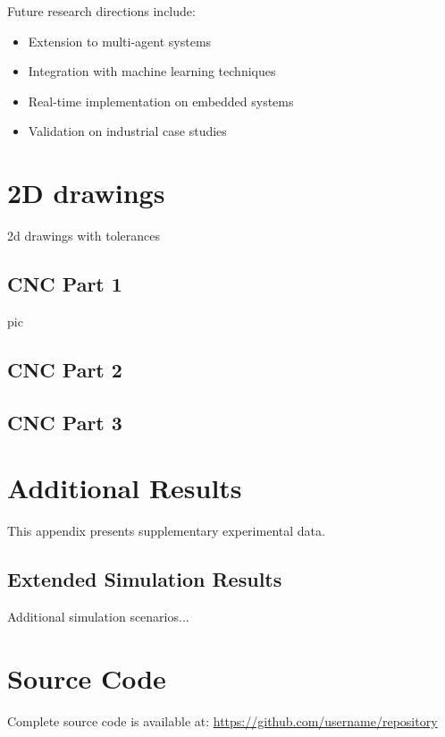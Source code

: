 \documentclass[11pt,a4paper,twoside,openright]{book}
\begin{document}
Future research directions include:
\begin{itemize}
    \item Extension to multi-agent systems
    \item Integration with machine learning techniques
    \item Real-time implementation on embedded systems
    \item Validation on industrial case studies
\end{itemize}

\printbibliography[heading=bibintoc, title={References}]

\appendix

\chapter{2D drawings}
\label{app:derivations}

2d drawings with tolerances

\section{CNC Part 1}

pic
\section{CNC Part 2}
\section{CNC Part 3}
\chapter{Additional Results}
\label{app:results}

This appendix presents supplementary experimental data.

\section{Extended Simulation Results}

Additional simulation scenarios...

\chapter{Source Code}
\label{app:code}

Complete source code is available at: \url{https://github.com/username/repository}
\end{document}
